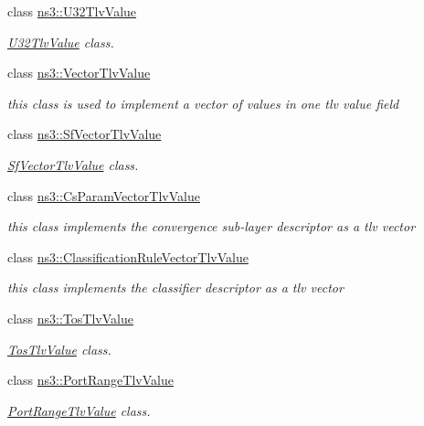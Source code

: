 \begin{DoxyCompactItemize}
class \hyperlink{classns3_1_1U32TlvValue}{ns3\+::\+U32\+Tlv\+Value}
\begin{DoxyCompactList}\small\item\em \hyperlink{classns3_1_1U32TlvValue}{U32\+Tlv\+Value} class. \end{DoxyCompactList}\item 
class \hyperlink{classns3_1_1VectorTlvValue}{ns3\+::\+Vector\+Tlv\+Value}
\begin{DoxyCompactList}\small\item\em this class is used to implement a vector of values in one tlv value field \end{DoxyCompactList}\item 
class \hyperlink{classns3_1_1SfVectorTlvValue}{ns3\+::\+Sf\+Vector\+Tlv\+Value}
\begin{DoxyCompactList}\small\item\em \hyperlink{classns3_1_1SfVectorTlvValue}{Sf\+Vector\+Tlv\+Value} class. \end{DoxyCompactList}\item 
class \hyperlink{classns3_1_1CsParamVectorTlvValue}{ns3\+::\+Cs\+Param\+Vector\+Tlv\+Value}
\begin{DoxyCompactList}\small\item\em this class implements the convergence sub-\/layer descriptor as a tlv vector \end{DoxyCompactList}\item 
class \hyperlink{classns3_1_1ClassificationRuleVectorTlvValue}{ns3\+::\+Classification\+Rule\+Vector\+Tlv\+Value}
\begin{DoxyCompactList}\small\item\em this class implements the classifier descriptor as a tlv vector \end{DoxyCompactList}\item 
class \hyperlink{classns3_1_1TosTlvValue}{ns3\+::\+Tos\+Tlv\+Value}
\begin{DoxyCompactList}\small\item\em \hyperlink{classns3_1_1TosTlvValue}{Tos\+Tlv\+Value} class. \end{DoxyCompactList}\item 
class \hyperlink{classns3_1_1PortRangeTlvValue}{ns3\+::\+Port\+Range\+Tlv\+Value}
\begin{DoxyCompactList}\small\item\em \hyperlink{classns3_1_1PortRangeTlvValue}{Port\+Range\+Tlv\+Value} class. \end{DoxyCompactList}\item 

\end{DoxyCompactItemize}
